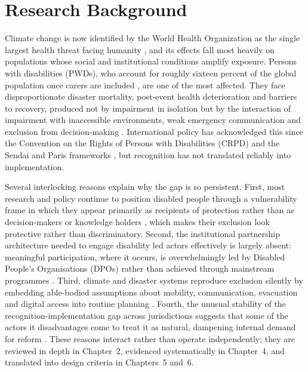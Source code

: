 \documentclass[12pt,a4paper]{report}
\begin{document}
\section{Research Background}
Climate change is now identified by the World Health Organization as the single largest health threat facing humanity \cite{paz2024climate,uddin2024health}, and its effects fall most heavily on populations whose social and institutional conditions amplify exposure. Persons with disabilities (PWDs), who account for roughly sixteen percent of the global population once carers are included \cite{kosanic2022inclusive,UN_Disability_Development_Report_2024,madans2017measuring}, are one of the most affected. They face disproportionate disaster mortality, post-event health deterioration and barriers to recovery, produced not by impairment in isolation but by the interaction of impairment with inaccessible environments, weak emergency communication and exclusion from decision-making \cite{gaskin2017factors,stein2024advancing}. International policy has acknowledged this since the Convention on the Rights of Persons with Disabilities (CRPD) and the Sendai and Paris frameworks \cite{UN_CRPD_2006,UNISDR_Sendai_Framework_2015,UN_Paris_Agreement_2015}, but recognition has not translated reliably into implementation.

Several interlocking reasons explain why the gap is so persistent. First, most research and policy continue to position disabled people through a vulnerability frame in which they appear primarily as recipients of protection rather than as decision-makers or knowledge holders \cite{sheknoble2023communicating,Harpur2025}, which makes their exclusion look protective rather than discriminatory. Second, the institutional partnership architecture needed to engage disability led actors effectively is largely absent: meaningful participation, where it occurs, is overwhelmingly led by Disabled People's Organisations (DPOs) rather than achieved through mainstream programmes \cite{pertiwi2019dpo,villeneuve2017dpo,rahatiningtyas2025yogyakarta,twigg2014attitude}. Third, climate and disaster systems reproduce exclusion silently by embedding able-bodied assumptions about mobility, communication, evacuation and digital access into routine planning \cite{lunga2019zimbabwe,gershon2021fema}. Fourth, the unusual stability of the recognition-implementation gap across jurisdictions suggests that some of the actors it disadvantages come to treat it as natural, dampening internal demand for reform \cite{setijaningrum2024tokenism,Akike2025}. These reasons interact rather than operate independently; they are reviewed in depth in Chapter~2, evidenced systematically in Chapter~4, and translated into design criteria in Chapters~5 and~6.
\end{document}
